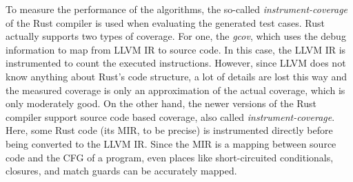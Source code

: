 \documentclass[paper=a4,%
  twoside,%
  BCOR4mm,%
  abstract=true,%
  toc=bibliography,%
  chapterprefix=true,%
  toc=bibliographynumbered,%
  open=right,%
  english,%
  pagesize=pdftex]{scrreprt}
\begin{document}

To measure the performance of the algorithms, the so-called \textit{instrument-coverage} of the Rust compiler is used when evaluating the generated test cases. Rust actually supports two types of coverage. For one, the \textit{gcov}, which uses the debug information to map from LLVM \ac{IR} to source code. In this case, the LLVM \ac{IR} is instrumented to count the executed instructions. However, since LLVM does not know anything about Rust's code structure, a lot of details are lost this way and the measured coverage is only an approximation of the actual coverage, which is only moderately good. On the other hand, the newer versions of the Rust compiler support source code based coverage, also called \textit{instrument-coverage}. Here, some Rust code (its \ac{MIR}, to be precise) is instrumented directly before being converted to the LLVM \ac{IR}. Since the \ac{MIR} is a mapping between source code and the \ac{CFG} of a program, even places like short-circuited conditionals, closures, and match guards can be accurately mapped.

\end{document}
